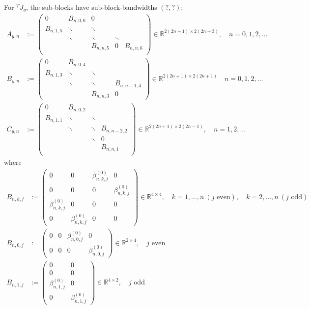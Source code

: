 \documentclass[11pt, oneside]{article}   	%
\newcommand{\R}{\mathbb{R}}
\newcommand{\jacobimattangent}{{}^T\!J}
\newcommand{\jacobimattangenty}{\jacobimattangent_y}
\newcommand{\betao}{\beta^{(0)}}
\newcommand{\betaonkj}{\betao_{n,k,j}}
\begin{document}
For $\jacobimattangenty$, the sub-blocks have sub-block-bandwidths $(?,?)$:
\begin{align*}
	A_{y,n} &:= 
		\begin{pmatrix}
			0 & B_{n,0,6} & 0 & & \\
			B_{n,1,5} & \ddots & \ddots & & \\
			& \ddots & \ddots & \ddots & \\
			& & B_{n,n,5} & 0 & B_{n,n,6} \\
		\end{pmatrix} \in \R^{2(2n+1)\times2(2n+3)}, \quad n = 0,1,2,\dots \\
	B_{y,n} &:= 
		\begin{pmatrix}
			0 & B_{n,0,4} & & \\
			B_{n,1,3} & \ddots & \ddots & \\
			& \ddots & \ddots & B_{n,n-1,4} \\
			& & B_{n,n,3} & 0
		\end{pmatrix} \in \R^{2(2n+1)\times2(2n+1)}  \quad n = 0,1,2,\dots \\
	C_{y,n} &:= 
		\begin{pmatrix}
			0 & B_{n,0,2} & & \\
			B_{n,1,1} & \ddots & \ddots & \\
			& \ddots & \ddots & B_{n,n-2,2} \\
			& & \ddots & 0 \\
			& & & B_{n,n,1} \\
		\end{pmatrix} \in \R^{2(2n+1)\times2(2n-1)}, \quad n = 1,2,\dots
\end{align*}
where
\begin{align*}
	B_{n,k,j} &:= 
		\begin{pmatrix}
			0 & 0 & \betaonkj & 0 \\
			0 & 0 & 0 & \betaonkj \\
			\betaonkj & 0 & 0 & 0 \\
			0 & \betaonkj & 0 & 0
		\end{pmatrix} \in \R^{4\times4}, \quad k = 1,\dots,n \: (j \text{ even}), \quad k = 2,\dots,n \: (j \text{ odd}) \\
	B_{n,0,j} &:=
		\begin{pmatrix}
			0 & 0 & \betao_{n,0,j} & 0 \\
			0 & 0 & 0 & \betao_{n,0,j}
		\end{pmatrix} \in \R^{2\times4}, \quad j \text{ even} \\
	B_{n,1,j} &:=
		\begin{pmatrix}
			0 & 0 \\
			0 & 0 \\
			\betao_{n,1,j} & 0 \\
			0 & \betao_{n,1,j}
		\end{pmatrix} \in \R^{4\times2}, \quad j \text{ odd}
\end{align*}
\end{document}

